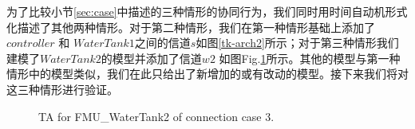 为了比较小节\ref{sec:case}中描述的三种情形的协同行为，我们同时用时间自动机形式化描述了其他两种情形。对于第二种情形，我们在第一种情形基础上添加了$controller$ 和 $WaterTank1$之间的信道$s$如图\ref{tk-arch2}所示；对于第三种情形我们建模了$WaterTank2$的模型并添加了信道$w2$ 如图Fig.\ref{arc3}所示。其他的模型与第一种情形中的模型类似，我们在此只给出了新增加的或有改动的模型。接下来我们将对这三种情形进行验证。
\begin{figure}[htbp]
\end{figure}
\begin{figure}[htbp]
	\caption{TA for FMU\_WaterTank2 of connection case 3.}\label{arc3}
\end{figure}

